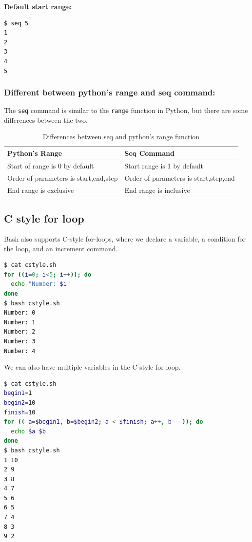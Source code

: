 \textbf{Default start range:}

\begin{lstlisting}[language=bash]
$ seq 5
1
2
3
4
5
\end{lstlisting}

\subsubsection{Different between python's range and seq command:}

The \lstinline|seq| command is similar to the \lstinline|range| function in Python, but there are some differences between the two.

\begin{table}[h!]
  \caption{Differences between seq and python's range function}
  \begin{tabular}{l l}
    \toprule
    \textbf{Python's Range} & \textbf{Seq Command} \\
    \midrule
    Start of range is 0 by default & Start range is 1 by default \\
    Order of parameters is start,end,step & Order of parameters is start,step,end \\
    End range is exclusive & End range is inclusive \\
    \bottomrule
  \end{tabular}
\end{table}

\subsection{C style for loop}

Bash also supports C-style for-loops, where we declare a variable, a condition for the loop, and an increment command.

\begin{lstlisting}[language=bash]
$ cat cstyle.sh
for ((i=0; i<5; i++)); do
  echo "Number: $i"
done
$ bash cstyle.sh
Number: 0
Number: 1
Number: 2
Number: 3
Number: 4
\end{lstlisting}

We can also have multiple variables in the C-style for loop.

\begin{lstlisting}[language=bash]
$ cat cstyle.sh
begin1=1
begin2=10
finish=10
for (( a=$begin1, b=$begin2; a < $finish; a++, b-- )); do
  echo $a $b
done
$ bash cstyle.sh
1 10
2 9
3 8
4 7
5 6
6 5
7 4
8 3
9 2
\end{lstlisting}

